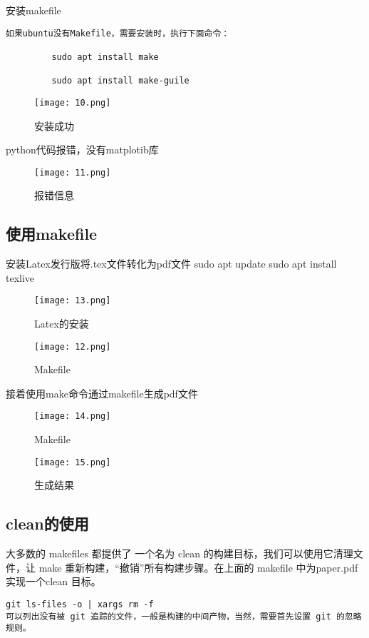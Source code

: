 \documentclass[a4paper, 12pt]{article}
\begin{document}
安装makefile
\begin{lstlisting}
如果ubuntu没有Makefile，需要安装时，执行下面命令：

         sudo apt install make

         sudo apt install make-guile
\end{lstlisting}

\begin{figure}[H]
  \centering
    \texttt{[image: 10.png]}
  \caption{安装成功}
   \end{figure}

python代码报错，没有matplotib库
\begin{figure}[H]
  \centering
    \texttt{[image: 11.png]}
  \caption{报错信息}
   \end{figure}
   
 \subsection{使用makefile} 
安装Latex发行版将.tex文件转化为pdf文件
sudo apt update
sudo apt install texlive

\begin{figure}[H]
  \centering
\texttt{[image: 13.png]}
  \caption{Latex的安装}
   \end{figure}
   
\begin{figure}[H]
  \centering
\texttt{[image: 12.png]}
  \caption{Makefile}
   \end{figure}

接着使用make命令通过makefile生成pdf文件
\begin{figure}[H]
  \centering
\texttt{[image: 14.png]}
  \caption{Makefile}
   \end{figure}
   
   \begin{figure}[H]
  \centering
\texttt{[image: 15.png]}
  \caption{生成结果}
   \end{figure}
   
  \subsection{clean的使用}  
   大多数的 makefiles 都提供了 一个名为 clean 的构建目标，我们可以使用它清理文件，让 make 重新构建，“撤销”所有构建步骤。在上面的 makefile 中为paper.pdf实现一个clean 目标。
\begin{lstlisting}
git ls-files -o | xargs rm -f 
可以列出没有被 git 追踪的文件，一般是构建的中间产物，当然，需要首先设置 git 的忽略规则。
\end{lstlisting}
\end{document}
